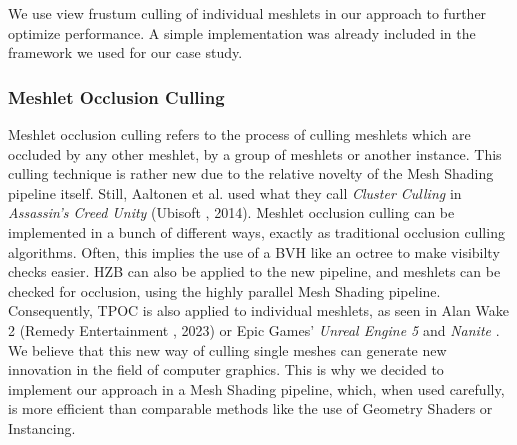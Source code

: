 \noindent
We use view frustum culling of individual meshlets in our approach to further optimize performance. A simple 
implementation was already included in the framework we used for our case study.

\subsubsection{Meshlet Occlusion Culling} \label{subsubsec-meshlet-occlusion-culling}

Meshlet occlusion culling refers to the process of culling meshlets which are occluded by any other meshlet, by a 
group of meshlets or another instance. This culling technique is rather new due to the relative novelty of the 
Mesh Shading pipeline itself. Still, Aaltonen et al. \cite{Aaltonen2015} used what they call \emph{Cluster Culling} in 
\emph{Assassin's Creed Unity} (Ubisoft \cite{Ubisoft2014}, 2014). Meshlet occlusion culling can be implemented in 
a bunch of different ways, exactly as traditional occlusion culling algorithms. Often, this implies the use of a 
\ac{BVH} like an octree to make visibilty checks easier. \ac{HZB} can also be applied to the new pipeline, and meshlets 
can be checked for occlusion, using the highly parallel Mesh Shading pipeline. Consequently, \ac{TPOC} is also applied 
to individual meshlets, as seen in Alan Wake 2 (Remedy Entertainment \cite{Remedy2023}, 2023) or Epic Games' 
\emph{Unreal Engine 5} and \emph{Nanite} \cite{Karis2021}.\\

\noindent
We believe that this new way of culling single meshes can generate new innovation in the field of computer graphics.
This is why we decided to implement our approach in a Mesh Shading pipeline, which, when used carefully, is more 
efficient than comparable methods like the use of Geometry Shaders or Instancing.